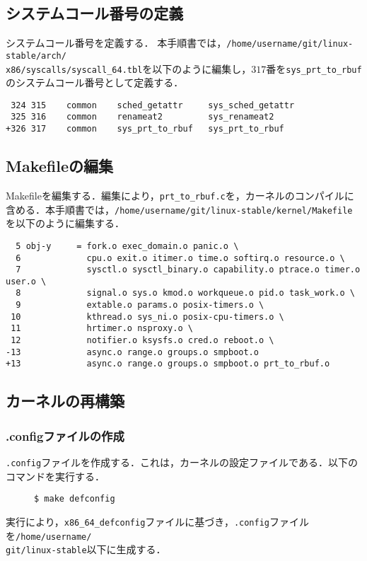 \documentclass[12pt]{jsarticle}
\begin{document}
\subsection{システムコール番号の定義}
システムコール番号を定義する．
本手順書では，\verb|/home/username/git/linux-stable/arch/|\\
\verb|x86/syscalls/syscall_64.tbl|を以下のように編集し，$317$番を\verb|sys_prt_to_rbuf|のシステムコール番号として定義する．
\begin{verbatim}
 324 315    common    sched_getattr     sys_sched_getattr
 325 316    common    renameat2	        sys_renameat2
+326 317    common    sys_prt_to_rbuf   sys_prt_to_rbuf
\end{verbatim}
\subsection{Makefileの編集}
Makefileを編集する．編集により，\verb|prt_to_rbuf.c|を，カーネルのコンパイルに含める．本手順書では，\verb|/home/username/git/linux-stable/kernel/Makefile|を以下のように編集する．
\begin{verbatim}
  5 obj-y     = fork.o exec_domain.o panic.o \
  6             cpu.o exit.o itimer.o time.o softirq.o resource.o \
  7             sysctl.o sysctl_binary.o capability.o ptrace.o timer.o user.o \
  8             signal.o sys.o kmod.o workqueue.o pid.o task_work.o \
  9             extable.o params.o posix-timers.o \
 10             kthread.o sys_ni.o posix-cpu-timers.o \
 11             hrtimer.o nsproxy.o \
 12             notifier.o ksysfs.o cred.o reboot.o \
-13             async.o range.o groups.o smpboot.o
+13             async.o range.o groups.o smpboot.o prt_to_rbuf.o
\end{verbatim}
\subsection{カーネルの再構築}
\subsubsection{.configファイルの作成}
\verb|.config|ファイルを作成する．これは，カーネルの設定ファイルである．以下のコマンドを実行する．
\begin{description}
\item[] \verb|$ make defconfig|
\end{description}
実行により，\verb|x86_64_defconfig|ファイルに基づき，\verb|.config|ファイルを\verb|/home/username/|\\
\verb|git/linux-stable|以下に生成する．
\end{document}

